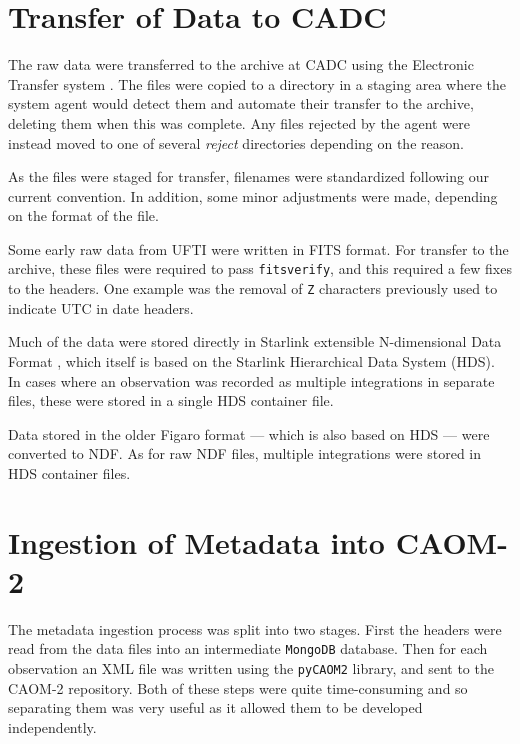 \documentclass[11pt,twoside]{article}
\begin{document}

\section{Transfer of Data to CADC}
\label{p01:sec:etransfer}

The raw data were transferred to the archive at CADC
using the
Electronic Transfer system \citep{2005ASPC..347..647M}.
The files were copied to a directory in a
staging area where the system agent would
detect them and automate their transfer to the
archive, deleting them when this was complete.
Any files rejected by the agent were instead moved
to one of several \textit{reject} directories depending
on the reason.

As the files were staged for transfer,
filenames were standardized following our current convention.
In addition,
some minor adjustments were made,
depending on the format of the file.


Some early raw data from UFTI were written in FITS format.
For transfer to the archive, these files were
required to pass
\texttt{fitsverify},
and this required a few fixes to the headers.
One example was the removal of \texttt{Z} characters
previously used to indicate UTC in date headers.


Much of the data were stored directly in
Starlink extensible N-dimensional Data Format
\citep[see for example,][]{P91_adassxxiii},
which itself is based on the
Starlink Hierarchical Data System (HDS).
In cases where an observation was recorded as
multiple integrations in separate files,
these were stored in a single HDS container file.


Data stored in the older Figaro format \citep{1993ASPC...52..219S}
--- which is also based on HDS ---
were converted to NDF.
As for raw NDF files, multiple integrations
were stored in HDS container files.

\section{Ingestion of Metadata into CAOM-2}

The metadata ingestion process was split into two stages.
First the headers were
read from the data files into an intermediate
\texttt{MongoDB} database.
Then for each observation an XML file was written
using the \texttt{pyCAOM2} library,
and sent to the CAOM-2 repository.
Both of these steps were quite time-consuming
and so separating them was very useful
as it allowed them to be developed
independently.
\end{document}
